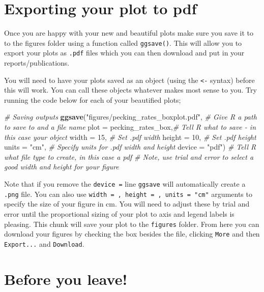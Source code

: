 \documentclass[
]{book}
\newenvironment{Shaded}{\begin{snugshade}}{\end{snugshade}}
\newcommand{\AttributeTok}[1]{\textcolor[rgb]{0.13,0.29,0.53}{#1}}
\newcommand{\CommentTok}[1]{\textcolor[rgb]{0.56,0.35,0.01}{\textit{#1}}}
\newcommand{\DecValTok}[1]{\textcolor[rgb]{0.00,0.00,0.81}{#1}}
\newcommand{\FunctionTok}[1]{\textcolor[rgb]{0.13,0.29,0.53}{\textbf{#1}}}
\newcommand{\NormalTok}[1]{#1}
\newcommand{\StringTok}[1]{\textcolor[rgb]{0.31,0.60,0.02}{#1}}
\begin{document}
\section{Exporting your plot to pdf}\label{exporting-your-plot-to-pdf}

Once you are happy with your new and beautiful plots make sure you save it to to the figures folder using a function called \texttt{ggsave()}. This will allow you to export your plots as \texttt{.pdf} files which you can then download and put in your reports/publications.

You will need to have your plots saved as an object (using the \texttt{\textless{}-} syntax) before this will work. You can call these objects whatever makes most sense to you. Try running the code below for each of your beautified plots;

\begin{Shaded}
\begin{Highlighting}[]
\CommentTok{\# Saving outputs}
\FunctionTok{ggsave}\NormalTok{(}\StringTok{"figures/pecking\_rates\_boxplot.pdf"}\NormalTok{, }\CommentTok{\# Give R a path to save to and a file name}
       \AttributeTok{plot =}\NormalTok{ pecking\_rates\_box,}\CommentTok{\# Tell R what to save {-} in this case your object}
       \AttributeTok{width =} \DecValTok{15}\NormalTok{, }\CommentTok{\# Set .pdf width}
       \AttributeTok{height =} \DecValTok{10}\NormalTok{, }\CommentTok{\# Set .pdf height}
       \AttributeTok{units =} \StringTok{"cm"}\NormalTok{, }\CommentTok{\# Specify units for .pdf width and height}
       \AttributeTok{device =} \StringTok{"pdf"}\NormalTok{) }\CommentTok{\# Tell R what file type to create, in this case a pdf}
\CommentTok{\# Note, use trial and error to select a good width and height for your figure}
\end{Highlighting}
\end{Shaded}

Note that if you remove the \texttt{device\ =} line \texttt{ggsave} will automatically create a \texttt{.png} file. You can also use \texttt{width\ =\ ,\ height\ =\ ,\ units\ =\ "cm"} arguments to specify the size of your figure in cm. You will need to adjust these by trial and error until the proportional sizing of your plot to axis and legend labels is pleasing. This chunk will save your plot to the \texttt{figures} folder. From here you can download your figures by checking the box besides the file, clicking \texttt{More} and then \texttt{Export...} and \texttt{Download}.

\section{Before you leave!}\label{before-you-leave-6}
\end{document}
